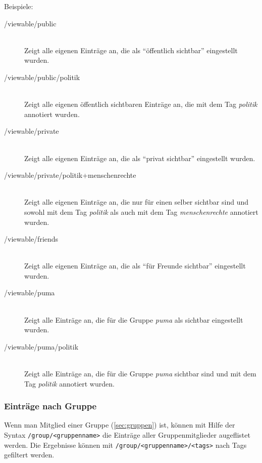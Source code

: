 Beispiele:
\begin{description}
    \item [/viewable/public] \hfill \\
    Zeigt alle eigenen Einträge an, die als \enquote{öffentlich sichtbar} eingestellt wurden.
    \item [/viewable/public/politik] \hfill \\
    Zeigt alle eigenen öffentlich sichtbaren Einträge an, die mit dem Tag \textit{politik} annotiert wurden.
    \item [/viewable/private] \hfill \\
    Zeigt alle eigenen Einträge an, die als \enquote{privat sichtbar} eingestellt wurden.
    \item [/viewable/private/politik+menschenrechte] \hfill \\
    Zeigt alle eigenen Einträge an, die nur für einen selber sichtbar sind und sowohl mit dem Tag \textit{politik} als auch mit dem Tag \textit{menschenrechte} annotiert wurden. 
    \item [/viewable/friends] \hfill \\
    Zeigt alle eigenen Einträge an, die als \enquote{für Freunde sichtbar} eingestellt wurden.
    \item [/viewable/puma] \hfill \\
    Zeigt alle Einträge an, die für die Gruppe \textit{puma} als sichtbar eingestellt wurden.
    \item [/viewable/puma/politik] \hfill \\
    Zeigt alle Einträge an, die für die Gruppe \textit{puma} sichtbar sind und mit dem Tag \textit{politik} annotiert wurden.
\end{description}

\subsubsection*{Einträge nach Gruppe}
\label{sss:nachGruppe}
Wenn man Mitglied einer Gruppe (\autoref{sec:gruppen}) ist, können mit Hilfe der Syntax \texttt{/group/<gruppenname>} die Einträge aller Gruppenmitglieder augeflistet werden. Die Ergebnisse können mit \texttt{/group/<gruppenname>/<tags>} nach Tags gefiltert werden.

